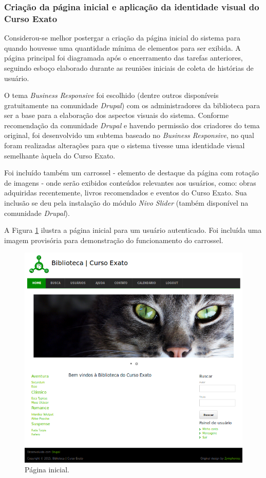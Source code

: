 \documentclass[a4paper]{article}
\begin{document}
\subsubsection{Criação da página inicial e aplicação da identidade visual do Curso Exato}

Considerou-se melhor postergar a criação da página inicial do sistema para quando houvesse uma quantidade mínima de elementos para ser exibida. A página principal foi diagramada após o encerramento das tarefas anteriores, seguindo esboço elaborado durante as reuniões iniciais de coleta de histórias de usuário.

O tema \textit{Business Responsive} foi escolhido (dentre outros disponíveis gratuitamente na comunidade \textit{Drupal}) com os administradores da biblioteca para ser a base para a elaboração dos aspectos visuais do sistema. Conforme recomendação da comunidade \textit{Drupal} e havendo permissão dos criadores do tema original, foi desenvolvido um subtema baseado no \textit{Business Responsive}, no qual foram realizadas alterações para que o sistema tivesse uma identidade visual semelhante àquela do Curso Exato.

Foi incluído também um carrossel - elemento de destaque da página com rotação de imagens - onde serão exibidos conteúdos relevantes aos usuários, como: obras adquiridas recentemente, livros recomendados e eventos do Curso Exato. Sua inclusão se deu pela instalação do módulo \textit{Nivo Slider} (também disponível na comunidade \textit{Drupal}).

A Figura \ref{home} ilustra a página inicial para um usuário autenticado. Foi incluída uma imagem provisória para demonstração do funcionamento do carrossel.

\begin{figure}[pbth!]
\centering
\includegraphics[width=140mm]{img/home-small.png}
\caption{Página inicial.\label{home}}
\end{figure}
\end{document}
